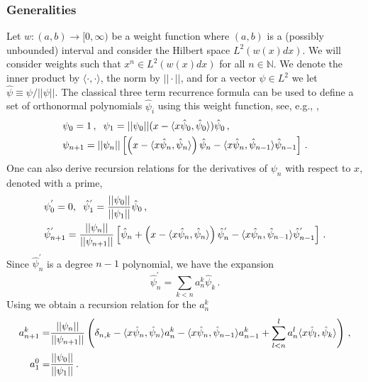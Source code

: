 \subsubsection{Generalities}\label{ortho-general}
Let $w:(a,b)\rightarrow [0,\infty)$ be a weight function where $(a,b)$ is a (possibly unbounded) interval and consider the Hilbert space $L^2(w(x) dx)$.   We will consider weights such that $x^n\in L^2(w(x) dx)$ for all $n\in\mathbb{N}$. We denote the inner product by $\langle\cdot,\cdot\rangle$, the norm by $||\cdot||$, and for a vector $\psi\in L^2$ we let $\hat{\psi}\equiv \psi/||\psi||$.  The classical three term recurrence formula can be used to define a set of orthonormal polynomials $\hat{\psi}_i$ using this weight function, see, e.g.,  \cite{Olver},
\begin{align}\label{poly_recursion}
&\psi_0=1\,, \hspace{2mm} \psi_1=||\psi_0||(x-\langle x\hat\psi_0,\hat{\psi}_0\rangle)\hat{\psi}_0\,,\\
&\psi_{n+1}=||\psi_n||\left[\left(x-\langle x\hat\psi_n,\hat\psi_n\rangle\right)\hat\psi_n-\langle x\hat\psi_n,\hat\psi_{n-1}\rangle\hat\psi_{n-1}\right]\,.\notag
\end{align}
One can also derive recursion relations for the derivatives of $\psi_n$ with respect to $x$, denoted with a prime,
\begin{align}\label{deriv_rec}
&\psi_0^{'}=0, \hspace{2mm} \hat{\psi}_1^{'}=\frac{||\psi_0||}{||\psi_1||}\hat\psi_0\,,\\
&\hat{\psi}_{n+1}^{'}=\frac{||\psi_n||}{||\psi_{n+1}||}\left[\hat\psi_n+\left(x-\langle x\hat\psi_n,\hat\psi_n\rangle\right)\hat{\psi}_n^{'}-\langle x\hat\psi_n,\hat\psi_{n-1}\rangle\hat{\psi}_{n-1}^{'}\right]\,.\notag
\end{align}
Since $\hat{\psi}_n^{'}$ is a degree $n-1$ polynomial, we have the expansion 
\begin{equation}
\hat{\psi}_n^{'}=\sum_{k<n} a_n^k \hat{\psi}_k\,.
\end{equation}
Using  we obtain a recursion relation for the $a_n^k$
\begin{align}
a_{n+1}^k=&\frac{||\psi_n||}{||\psi_{n+1}||}\left(\delta_{n,k}-\langle x\hat\psi_n,\hat\psi_{n}\rangle a_n^k-\langle x\hat\psi_n,\hat\psi_{n-1}\rangle a_{n-1}^k+\sum_{l<n}^la_n^l\langle x\hat\psi_l,\hat\psi_k\rangle\right)\,,\notag\\
a_1^0=&\frac{||\psi_0||}{||\psi_1||}\,.\notag
\end{align}

